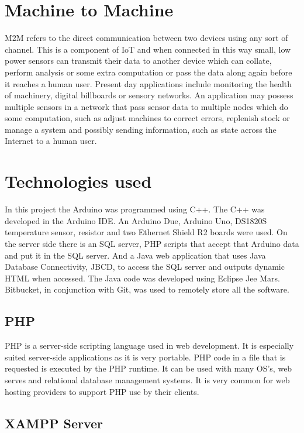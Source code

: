 \section{Machine to Machine}

M2M refers to the direct communication between two devices using any sort of channel. This is a component of IoT and when connected in this way small, low power sensors can transmit their data to another device which can collate, perform analysis or some extra computation or pass the data along again before it reaches a human user. Present day applications include monitoring the health of machinery, digital billboards or sensory networks. An application may possess multiple sensors in a network that pass sensor data to multiple nodes which do some computation, such as adjust machines to correct errors, replenish stock or manage a system and possibly sending information, such as state across the Internet to a human user.

\section{Technologies used}

In this project the Arduino was programmed using C++. The C++ was developed in the Arduino IDE. An Arduino Due, Arduino Uno, DS1820S temperature sensor, resistor and two Ethernet Shield R2 boards were used. On the server side there is an SQL server, PHP scripts that accept that Arduino data and put it in the SQL server. And a Java web application that uses Java Database Connectivity, JBCD, to access the SQL server and outputs dynamic HTML when accessed. The Java code was developed using Eclipse Jee Mars. Bitbucket, in conjunction with Git, was used to remotely store all the software.

\subsection{PHP}
PHP is a server-side scripting language used in web development. It is especially suited server-side applications as it is very portable. PHP code in a file that is requested is executed by the PHP runtime. It can be used with many OS's, web serves and relational database management systems. It is very common for web hosting providers to support PHP use by their clients.

\subsection{XAMPP Server}

